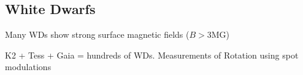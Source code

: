 {\color{red} \subsection{White Dwarfs}}
Many WDs show strong surface magnetic fields ($B>$3MG)

K2 + Tess + Gaia = hundreds of WDs. Measurements of Rotation using spot modulations
